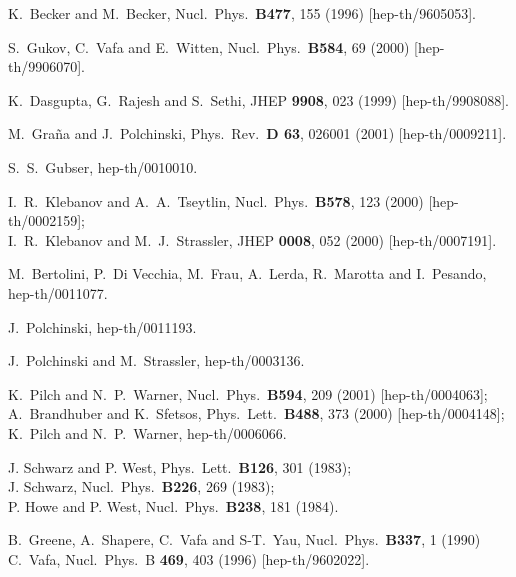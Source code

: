 \documentclass[a4paper,12pt]{article}
\renewcommand{\=}[1]{\bar{#1}}
\begin{document}
\begin{thebibliography}{10}
K.~Becker and M.~Becker,
Nucl.\ Phys.\ {\bf B477}, 155 (1996)
[hep-th/9605053].

S.~Gukov, C.~Vafa and E.~Witten,
Nucl.\ Phys.\  {\bf B584}, 69 (2000)
[hep-th/9906070].

K.~Dasgupta, G.~Rajesh and S.~Sethi,
JHEP {\bf 9908}, 023 (1999)
[hep-th/9908088].

M.~Gra\~na and J.~Polchinski,
Phys.\ Rev.\ {\bf D 63}, 026001 (2001)
[hep-th/0009211].

S.~S.~Gubser,
hep-th/0010010.

I.~R.~Klebanov and A.~A.~Tseytlin,
Nucl.\ Phys.\  {\bf B578}, 123 (2000)
[hep-th/0002159];\\
I.~R.~Klebanov and M.~J.~Strassler,
JHEP {\bf 0008}, 052 (2000)
[hep-th/0007191].

M.~Bertolini, P.~Di Vecchia, M.~Frau, A.~Lerda, R.~Marotta and I.~Pesando,
hep-th/0011077.

J.~Polchinski,
hep-th/0011193.

J.~Polchinski and M.~Strassler, hep-th/0003136.

K.~Pilch and N.~P.~Warner,
Nucl.\ Phys.\ {\bf B594}, 209 (2001)
[hep-th/0004063];\\
A.~Brandhuber and K.~Sfetsos,
Phys.\ Lett.\ {\bf B488}, 373 (2000)
[hep-th/0004148];\\
K.~Pilch and N.~P.~Warner,
hep-th/0006066.

J. Schwarz and P. West, Phys.\ Lett.\ {\bf B126}, 301 (1983);\\
J. Schwarz, Nucl.\ Phys.\ {\bf B226}, 269 (1983);\\
P. Howe and P. West, Nucl.\ Phys.\ {\bf B238}, 181 (1984).

B.~Greene, A.~Shapere, C.~Vafa and S-T.~Yau,
Nucl.\ Phys.\ {\bf B337}, 1 (1990)
C.~Vafa,
Nucl.\ Phys.\ B {\bf 469}, 403 (1996)
[hep-th/9602022].


\end{thebibliography}
\end{document}
